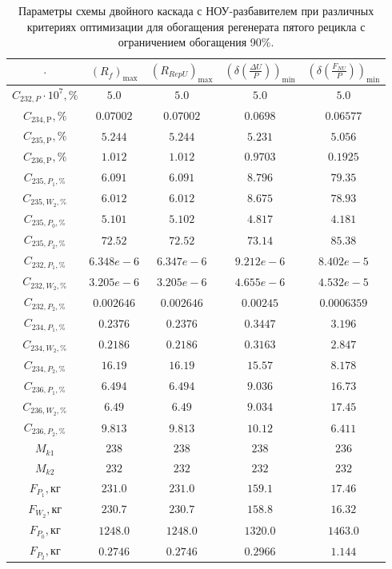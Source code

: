 \begin{table}
    \centering
    \begin{tabular}{|c|cccc|}
        \hline $\cdot$ & $(R_f)_\text{max}$ & $(R_{RepU})_\text{max}$ & $(\delta(\frac{\Delta U}{P}))_\text{min}$ & $(\delta(\frac{F_{NU}}{P}))_\text{min}$\\ \hline
    $C_{232,P}\cdot10^{7}, \%$ & $5.0$ & $5.0$ & $5.0$ & $5.0$\\ \hline
    $C_{234,\text{P}}, \%$  & $0.07002$ & $0.07002$ & $0.0698$ & $0.06577$\\ \hline
    $C_{235,\text{P}}, \%$  & $5.244$ & $5.244$ & $5.231$ & $5.056$\\ \hline
    $C_{236,\text{P}}, \%$  & $1.012$ & $1.012$ & $0.9703$ & $0.1925$\\ \hline
    $C_{235,P_1, \%}$     & $6.091$ & $6.091$ & $8.796$ & $79.35$\\ \hline
    $C_{235,W_2, \%}$     & $6.012$ & $6.012$ & $8.675$ & $78.93$\\ \hline
    $C_{235,P_0, \%}$     & $5.101$ & $5.102$ & $4.817$ & $4.181$\\ \hline
    $C_{235,P_2, \%}$     & $72.52$ & $72.52$ & $73.14$ & $85.38$\\ \hline
    $C_{232,P_1, \%}$     & $6.348e-6$ & $6.347e-6$ & $9.212e-6$ & $8.402e-5$\\ \hline
    $C_{232,W_2, \%}$     & $3.205e-6$ & $3.205e-6$ & $4.655e-6$ & $4.532e-5$\\ \hline
    $C_{232,P_2, \%}$     & $0.002646$ & $0.002646$ & $0.00245$ & $0.0006359$\\ \hline
    $C_{234,P_1, \%}$     & $0.2376$ & $0.2376$ & $0.3447$ & $3.196$\\ \hline
    $C_{234,W_2, \%}$     & $0.2186$ & $0.2186$ & $0.3163$ & $2.847$\\ \hline
    $C_{234,P_2, \%}$     & $16.19$ & $16.19$ & $15.57$ & $8.178$\\ \hline
    $C_{236,P_1, \%}$     & $6.494$ & $6.494$ & $9.036$ & $16.73$\\ \hline
    $C_{236,W_2, \%}$     & $6.49$ & $6.49$ & $9.034$ & $17.45$\\ \hline
    $C_{236,P_2, \%}$     & $9.813$ & $9.813$ & $10.12$ & $6.411$\\ \hline
    $M_{k1}$              & $238$ & $238$ & $238$ & $236$\\ \hline
    $M_{k2}$              & $232$ & $232$ & $232$ & $232$\\ \hline
    $F_{P_1}, \text{кг}$  & $231.0$ & $231.0$ & $159.1$ & $17.46$\\ \hline
    $F_{W_2}, \text{кг}$  & $230.7$ & $230.7$ & $158.8$ & $16.32$\\ \hline
    $F_{P_0}, \text{кг}$  & $1248.0$ & $1248.0$ & $1320.0$ & $1463.0$\\ \hline
    $F_{P_2}, \text{кг}$  & $0.2746$ & $0.2746$ & $0.2966$ & $1.144$\\ \hline
    \end{tabular}
\caption{Параметры схемы двойного каскада с НОУ-разбавителем при различных критериях оптимизации для обогащения регенерата пятого рецикла с ограничением обогащения 90\%.{\label{2opt5_90}}}
\end{table}


